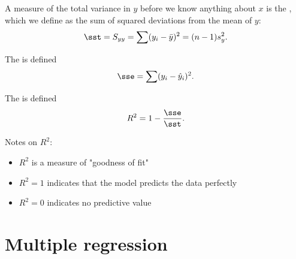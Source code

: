 \documentclass{article}
\begin{document}
\begin{definition}
	A measure of the total variance in $y$ before we know anything
	about $x$ is the , which we define
	as the sum of squared deviations from the mean of $y$:
	\begin{align*}
		\sst = S_{yy} = \sum (y_i - \bar y)^2 = (n-1)s^2_y.
	\end{align*}
\end{definition}
\begin{definition}
	The  is defined
	\begin{align*}
		\sse = \sum (y_i -\hat y_i)^2.
	\end{align*}
\end{definition}
\begin{definition}
	The  is defined
	\begin{align*}
		R^2 = 1-\frac{\sse}{\sst}.
	\end{align*}
\end{definition}
Notes on $R^2$:
\begin{itemize}
	\item $R^2$ is a measure of "goodness of fit"
	\item $R^2=1$ indicates that the model predicts the data perfectly
	\item $R^2=0$ indicates no predictive value
\end{itemize}


\section{Multiple regression}
\end{document}
